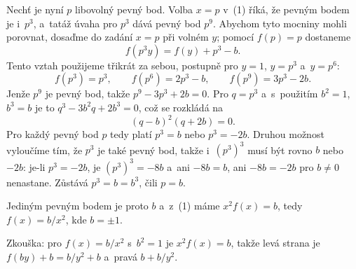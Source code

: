 {    Nechť je nyní $p$ libovolný pevný bod. Volba $x=p$ v~(1) říká, že pevným bodem je i~$p^3$, a~tatáž úvaha pro $p^3$ dává pevný bod $p^9$. Abychom tyto mocniny mohli porovnat, dosaďme do zadání $x=p$ při volném $y$; pomocí $f(p)=p$ dostaneme
    $$
    f(p^3y) = f(y)+p^3-b.
    $$
    Tento vztah použijeme třikrát za sebou, postupně pro $y=1$, $y=p^3$ a~$y=p^6$:
    $$
    f(p^3)=p^3,\qquad f(p^6)=2p^3-b,\qquad f(p^9)=3p^3-2b.
    $$
    Jenže $p^9$ je pevný bod, takže $p^9-3p^3+2b=0$. Pro $q=p^3$ a~s~použitím $b^2=1$, $b^3=b$ je to $q^3-3b^2q+2b^3=0$, což se rozkládá na
    $$
    (q-b)^2(q+2b) = 0.
    $$
    Pro každý pevný bod $p$ tedy platí $p^3=b$ nebo $p^3=-2b$. Druhou možnost vyloučíme tím, že $p^3$ je také pevný bod, takže i~$(p^3)^3$ musí být rovno $b$ nebo $-2b$: je-li $p^3=-2b$, je $(p^3)^3=-8b$ a~ani $-8b=b$, ani $-8b=-2b$ pro $b\neq0$ nenastane. Zůstává $p^3=b=b^3$, čili $p=b$.

    Jediným pevným bodem je proto $b$ a~z~(1) máme $x^2f(x)=b$, tedy $f(x)=b/x^2$, kde $b=\pm1$.

    Zkouška: pro $f(x)=b/x^2$ s~$b^2=1$ je $x^2f(x)=b$, takže levá strana je $f(by)+b=b/y^2+b$ a~pravá $b+b/y^2$.
}

